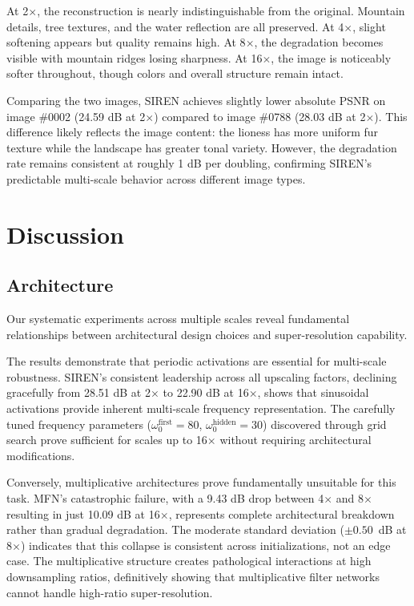 \documentclass[a4paper,oneside,10pt,ngerman,english]{scrartcl}
\begin{document}
At 2$\times$, the reconstruction is nearly indistinguishable from the original. Mountain details, tree textures, and the water reflection are all preserved. At 4$\times$, slight softening appears but quality remains high. At 8$\times$, the degradation becomes visible with mountain ridges losing sharpness. At 16$\times$, the image is noticeably softer throughout, though colors and overall structure remain intact.

Comparing the two images, SIREN achieves slightly lower absolute PSNR on image \#0002 (24.59 dB at 2$\times$) compared to image \#0788 (28.03 dB at 2$\times$). This difference likely reflects the image content: the lioness has more uniform fur texture while the landscape has greater tonal variety. However, the degradation rate remains consistent at roughly 1 dB per doubling, confirming SIREN's predictable multi-scale behavior across different image types.

\cleardoubleoddpage
\section{Discussion}

\subsection{Architecture}

Our systematic experiments across multiple scales reveal fundamental relationships between architectural design choices and super-resolution capability.

The results demonstrate that periodic activations are essential for multi-scale robustness. SIREN's consistent leadership across all upscaling factors, declining gracefully from 28.51 dB at 2$\times$ to 22.90 dB at 16$\times$, shows that sinusoidal activations provide inherent multi-scale frequency representation. The carefully tuned frequency parameters ($\omega_0^{\text{first}} = 80$, $\omega_0^{\text{hidden}} = 30$) discovered through grid search prove sufficient for scales up to 16$\times$ without requiring architectural modifications.

Conversely, multiplicative architectures prove fundamentally unsuitable for this task. MFN's catastrophic failure, with a 9.43 dB drop between 4$\times$ and 8$\times$ resulting in just 10.09 dB at 16$\times$, represents complete architectural breakdown rather than gradual degradation. The moderate standard deviation ($\pm 0.50$~dB at 8$\times$) indicates that this collapse is consistent across initializations, not an edge case. The multiplicative structure creates pathological interactions at high downsampling ratios, definitively showing that multiplicative filter networks cannot handle high-ratio super-resolution.
\end{document}
